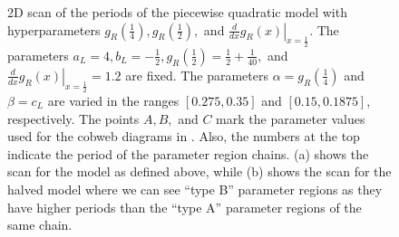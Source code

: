 \begin{figure}
	\centering
	\caption[2D scan of the periods of the quadratic model with hyperparameters for different values of the fixed parameters]{
	2D scan of the periods of the piecewise quadratic model with hyperparameters $g_R\left(\frac{1}{4}\right), g_R\left(\frac{1}{2}\right),$ and $\left. \frac{d}{dx} g_R\left(x\right) \right|_{x = \frac{1}{2}}$.
	The parameters $a_L = 4, b_L = -\frac{1}{2}, g_R\left(\frac{1}{2}\right) = \frac{1}{2} + \frac{1}{40},$ and $\left. \frac{d}{dx} g_R\left(x\right) \right|_{x = \frac{1}{2}} = 1.2$ are fixed.
	The parameters $\alpha = g_R\left(\frac{1}{4}\right)$ and $\beta = c_L$ are varied in the ranges $[0.275, 0.35]$ and $[0.15, 0.1875]$, respectively.
	The points $A, B,$ and $C$ mark the parameter values used for the cobweb diagrams in .
	Also, the numbers at the top indicate the period of the parameter region chains.
	(a) shows the scan for the model as defined above, while (b) shows the scan for the halved model where we can see ``type B'' parameter regions as they have higher periods than the ``type A'' parameter regions of the same chain.
	}
	\label{fig:setup.quad.hyper.2.period}
\end{figure}

